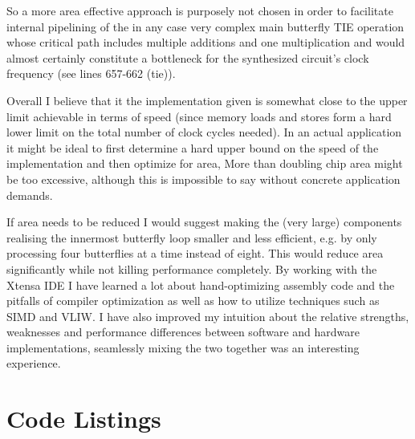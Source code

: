 \documentclass[ngerman, cd=lightcolor]{tudscrreprt}
\begin{document}
So a more area effective approach is purposely not chosen in order to
facilitate internal pipelining of the in any case very complex main butterfly
TIE operation whose critical path includes multiple additions and one
multiplication and would almost certainly constitute a bottleneck for the
synthesized circuit’s clock frequency (see lines 657-662 (tie)).

Overall I believe that it the implementation given is somewhat close to the
upper limit achievable in terms of speed (since memory loads and stores form a
hard lower limit on the total number of clock cycles needed). In an actual
application it might be ideal to first determine a hard upper bound on the
speed of the implementation and then optimize for area, More than doubling chip
area might be too excessive, although this is impossible to say without
concrete application demands.

If area needs to be reduced I would suggest making the (very large) components
realising the innermost butterfly loop smaller and less efficient, e.g. by only
processing four butterflies at a time instead of eight. This would reduce area
significantly while not killing performance completely.  By working with the
Xtensa IDE I have learned a lot about hand-optimizing assembly code and the
pitfalls of compiler optimization as well as how to utilize techniques such as
SIMD and VLIW. I have also improved my intuition about the relative strengths,
weaknesses and performance differences between software and hardware
implementations, seamlessly mixing the two together was an interesting
experience.

\chapter{Code Listings}

\ 

\inputminted{text}{../project/source/asm/fft.S}

\inputminted{text}{../project/source/tie/fft.tie}
\end{document}

